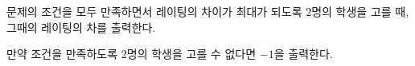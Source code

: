 문제의 조건을 모두 만족하면서 레이팅의 차이가 최대가 되도록 $2$명의 학생을 고를 때, 그때의 레이팅의 차를 출력한다.

만약 조건을 만족하도록 $2$명의 학생을 고를 수 없다면 $-1$을 출력한다.